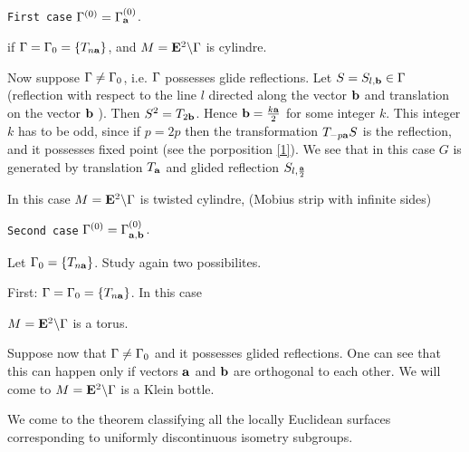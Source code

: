 \documentclass[12pt]{article}
\theoremstyle{definition}
\numberwithin{equation}{section}
\begin{document}
{\tt First case} ${\Gamma}^{(0)}={\Gamma}^{(0)}_{\bf a}$.

if ${\Gamma}={\Gamma}_0=\{T_{n{\bf a}}\}$,
and $M={\bf E}^2\backslash {\Gamma}$ is cylindre.

Now suppose  ${\Gamma}\not={\Gamma}_0$,
i.e. ${\Gamma}$ possesses glide reflections.
Let $S=S_{l,{\bf b}}\in {\Gamma}$
(reflection with respect to the line 
$l$ directed along the vector
${\bf b}$ and translation
on the vector ${\bf b}$ ). Then
$S^2=T_{2{\bf b}}$. Hence ${\bf b}={k{\bf a}\over 2}$
for some integer $k$. This integer $k$ has to be odd,
since if $p=2p$ then the transformation $T_{-p{\bf a}}S$
is the reflection, and it possesses fixed point
(see the porposition \ref{1}). 
We see that in this case $G$ is generated by translation
$T_{\bf a}$ and glided reflection  $S_{l,{{\bf a}\over 2}}$

In this case
$M={\bf E}^2\backslash {\Gamma}$ is twisted cylindre, 
(Mobius strip
with infinite sides)
\m


{\tt Second case} ${\Gamma}^{(0)}={\Gamma}^{(0)}_{{\bf a},{\bf b}}$.

Let   ${\Gamma}_0=\{T_{n{\bf a}}\}$. Study again 
 two possibilites.

First:
${\Gamma}={\Gamma}_0=\{T_{n{\bf a}}\}$. In this case

$M={\bf E}^2\backslash {\Gamma}$ is a torus.


Suppose now that ${\Gamma}\not={\Gamma}_0$ and it possesses glided
reflections. One can see that this can happen
only if vectors ${\bf a}$ and ${\bf b}$ are orthogonal to each
other. We will come to
$M={\bf E}^2\backslash {\Gamma}$ is a Klein bottle.

We come to the theorem classifying
all the locally Euclidean surfaces corresponding
to uniformly discontinuous isometry subgroups.
\end{document}
